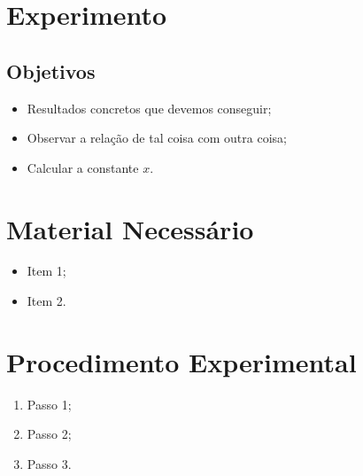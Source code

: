 \section{Experimento}

\subsection{Objetivos}

\begin{itemize}
	\item Resultados concretos que devemos conseguir;
	\item Observar a relação de tal coisa com outra coisa;
	\item Calcular a constante $x$.
\end{itemize}

\section{Material Necessário}

\begin{itemize}
	\item Item 1;
	\item Item 2.
\end{itemize}

\section{Procedimento Experimental}

\begin{enumerate}
	\item Passo 1;
	\item Passo 2;
	\item Passo 3.
\end{enumerate}


